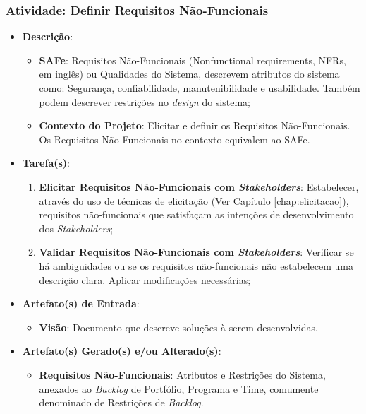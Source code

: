 			\subsubsection[Atividade: Definir Requisitos Não-Funcionais]{Atividade: Definir Requisitos Não-Funcionais}
			\label{subsubsec:processo_atividade_programa_definir_rnf}
				\begin{itemize}
					\item{\textbf{Descrição}:
						\begin{itemize}
							\item{\textbf{SAFe}: Requisitos Não-Funcionais (Nonfunctional requirements, NFRs, em inglês) ou Qualidades do Sistema, descrevem atributos do sistema como: Segurança, confiabilidade, manutenibilidade e usabilidade. Também podem descrever restrições no \emph{design} do sistema;}
							\item{\textbf{Contexto do Projeto}: Elicitar e definir os Requisitos Não-Funcionais. Os Requisitos Não-Funcionais no contexto equivalem ao SAFe.}
						\end{itemize}}
					\item{\textbf{Tarefa(s)}:
						\begin{enumerate}
							\item{\textbf{Elicitar Requisitos Não-Funcionais com \emph{Stakeholders}}: Estabelecer, através do uso de técnicas de elicitação (Ver Capítulo \ref{chap:elicitacao}), requisitos não-funcionais que satisfaçam as intenções de desenvolvimento dos \emph{Stakeholders};}
							\item{\textbf{Validar Requisitos Não-Funcionais com \emph{Stakeholders}}: Verificar se há ambiguidades ou se os requisitos não-funcionais não estabelecem uma descrição clara. Aplicar modificações necessárias;}
						\end{enumerate}}
					\item{\textbf{Artefato(s) de Entrada}:
						\begin{itemize}
							\item{\textbf{Visão}: Documento que descreve soluções à serem desenvolvidas.}
						\end{itemize}}
					\item{\textbf{Artefato(s) Gerado(s) e/ou Alterado(s)}:
						\begin{itemize}
							\item{\textbf{Requisitos Não-Funcionais}: Atributos e Restrições do Sistema, anexados ao \emph{Backlog} de Portfólio, Programa e Time, comumente denominado de Restrições de \emph{Backlog}.}

\end{itemize}}
\end{itemize}
